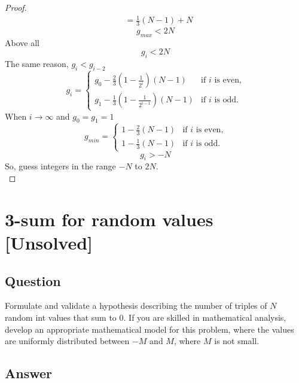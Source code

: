 \documentclass[12pt]{article}
\numberwithin{equation}{section}
\begin{document}
\begin{proof}
\begin{align*}
    &=\frac{1}{3}(N-1)+N
    \end{align*}
    \[g_{max}<2N\]
    Above all
    \[g_i<2N\]
    The same reason, $g_i<g_{i-2}$
    \[g_i=
    \begin{cases}
        g_0-\frac{2}{3}(1-\frac{1}{2^i})(N-1) & \text{if $i$ is even,}\\
        g_1-\frac{1}{3}(1-\frac{1}{2^{i-1}})(N-1) & \text{if $i$ is odd.}
    \end{cases}\]
    When $i \to \infty$ and $g_0=g_1=1$
    \[g_{min}=
    \begin{cases}
        1-\frac{2}{3}(N-1) & \text{if $i$ is even,}\\
        1-\frac{1}{3}(N-1) & \text{if $i$ is odd.}
    \end{cases}\]
    \[g_{i}>-N\]
    So, guess integers in the range $-N$ to $2N$.\\
\end{proof}

\newpage
\section{3-sum for random values [Unsolved]}
\subsection*{Question}
Formulate and validate a hypothesis describing the
number of triples of $N$ random int values that sum to 0.
If you are skilled in mathematical analysis, develop an
appropriate mathematical model for this problem, where
the values are uniformly distributed between $-M$ and $M$,
where $M$ is not small.
\subsection*{Answer}
\end{document}
